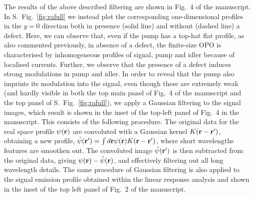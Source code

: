 The results of the above described filtering are shown in Fig.~4 of
the manuscript.
%
In S.~Fig.~\ref{fig:rafull} we instead plot the corresponding
one-dimensional profiles in the $y=0$ direction both in presence
(solid line) and without (dashed line) a defect. Here, we can observe
that, even if the pump has a top-hat flat profile, as also commented
previously, in absence of a defect, the finite-size OPO is
characterised by inhomogeneous profiles of signal, pump and idler
because of localised currents. Further, we observe that the presence
of a defect induces strong modulations in pump and idler.
%
In order to reveal that the pump also imprints its modulation into the
signal, even though these are extremely weak (and hardly visible in
both the top main panel of Fig.~4 of the manuscript and the top panel
of S.~Fig.~\ref{fig:rafull}), we apply a Gaussian filtering to the
signal images, which result is shown in the inset of the top-left
panel of Fig.~4 in the manuscript.
%
This consists of the following procedure. The original data for the
real space profile $\psi(\mathbf{r})$ are convoluted with a Gaussian
kernel $K(\mathbf{r} - \mathbf{r}')$, obtaining a new profile,
$\tilde{\psi}(\mathbf{r}') = \int d\mathbf{r} \psi (\mathbf{r}) K(\mathbf{r} -
\mathbf{r}')$, where short wavelengths features are smoothen out. The
convoluted image $\tilde{\psi}(\mathbf{r}')$ is then subtracted from the
original data, giving $\psi(\mathbf{r}) - \tilde{\psi}(\mathbf{r})$, and
effectively filtering out all long wavelength details.
%
The same procedure of Gaussian filtering is also applied to the signal
emission profile obtained within the linear response analysis and
shown in the inset of the top left panel of Fig.~2 of the manuscript.


